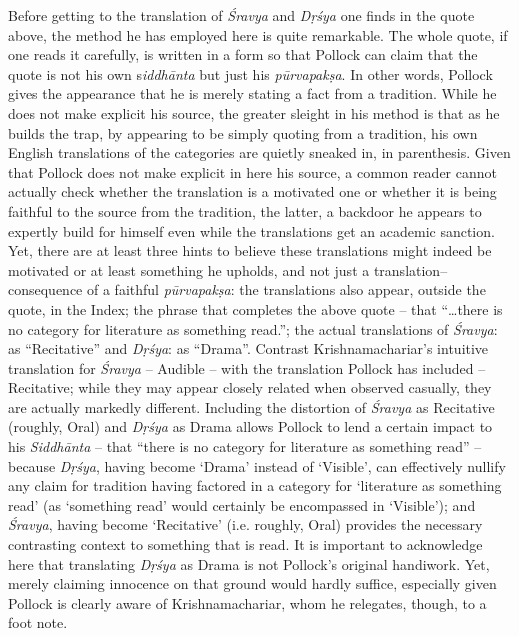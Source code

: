Before getting to the translation of \textit{Śravya} and \textit{Dṛśya} one finds in the quote above, the method he has employed here is quite remarkable. The whole quote, if one reads it carefully, is written in a form so that Pollock can claim that the quote is not his own s\textit{iddhānta} but just his \textit{pūrvapakṣa}. In other words, Pollock gives the appearance that he is merely stating a fact from a tradition. While he does not make explicit his source, the greater sleight in his method is that as he builds the trap, by appearing to be simply quoting from a tradition, his own English translations of the categories are quietly sneaked in, in parenthesis. Given that Pollock does not make explicit in here his source, a common reader cannot actually check whether the translation is a motivated one or whether it is being faithful to the source from the tradition, the latter, a backdoor he appears to expertly build for himself even while the translations get an academic sanction. Yet, there are at least three hints to believe these translations might indeed be motivated or at least something he upholds, and not just a translation–consequence of a faithful \textit{pūrvapakṣa}: the translations also appear, outside the quote, in the Index; the phrase that completes the above quote – that “…there is no category for literature as something read.”; the actual translations of \textit{Śravya}: as “Recitative” and \textit{Dṛśya}: as “Drama”. Contrast Krishnamachariar’s intuitive translation for \textit{Śravya} – Audible – with the translation Pollock has included – Recitative; while they may appear closely related when observed casually, they are actually markedly different. Including the distortion of \textit{Śravya} as Recitative (roughly, Oral) and \textit{Dṛśya} as Drama allows Pollock to lend a certain impact to his \textit{Siddhānta} – that “there is no category for literature as something read” – because \textit{Dṛśya}, having become ‘Drama’ instead of ‘Visible’, can effectively nullify any claim for tradition having factored in a category for ‘literature as something read’ (as ‘something read’ would certainly be encompassed in ‘Visible’); and \textit{Śravya}, having become ‘Recitative’ (i.e. roughly, Oral) provides the necessary contrasting context to something that is read. It is important to acknowledge here that translating \textit{Dṛśya} as Drama is not Pollock’s original handiwork. Yet, merely claiming innocence on that ground would hardly suffice, especially given Pollock is clearly aware of Krishnamachariar, whom he relegates, though, to a foot note.

